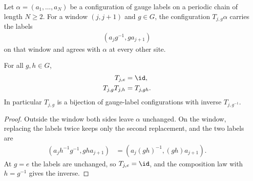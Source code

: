 \begin{definition}
    \label{def:mpug_chain_label_action}
    \leanok
    Let $\alpha=(a_1,\ldots,a_N)$ be a configuration of gauge labels on a
    periodic chain of length $N\geq2$. For a window $(j,j+1)$ and $g\in G$,
    the configuration $T_{j,g}\alpha$ carries the labels
    \begin{align}
        \left(a_jg^{-1},ga_{j+1}\right)
    \end{align}
    on that window and agrees with $\alpha$ at every other site.
\end{definition}

\begin{lemma}
    \label{thm:mpug_chain_label_action_mul}
    \leanok
    For all $g,h\in G$,
    \begin{align}
        T_{j,e}        & =\id,      \\
        T_{j,g}T_{j,h} & =T_{j,gh}.
        \label{eq:mpug_chain_label_action_mul}
    \end{align}
    In particular $T_{j,g}$ is a bijection of gauge-label configurations with
    inverse $T_{j,g^{-1}}$.
\end{lemma}

\begin{proof}\leanok
    Outside the window both sides leave $\alpha$ unchanged. On the window,
    replacing the labels twice keeps only the second replacement, and the two
    labels are
    \begin{align}
        \left(a_jh^{-1}g^{-1},gha_{j+1}\right)
         & =\left(a_j(gh)^{-1},(gh)a_{j+1}\right).
    \end{align}
    At $g=e$ the labels are unchanged, so $T_{j,e}=\id$, and the composition
    law with $h=g^{-1}$ gives the inverse.
\end{proof}

